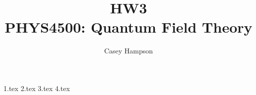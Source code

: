 \documentclass[titlepage]{article}
\title{HW3 \\[5pt] PHYS4500: Quantum Field Theory}
\author{Casey Hampson}
\begin{document}
    \maketitle
    \pagebreak

    {1.tex}
    {2.tex}
    {3.tex}
    {4.tex}
\end{document}
